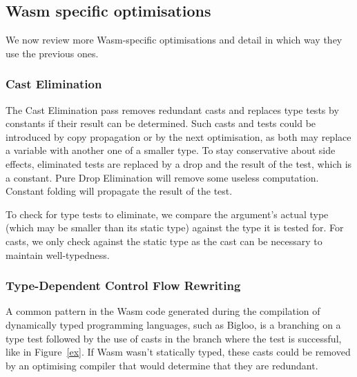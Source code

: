 \documentclass[a4paper,11pt]{article}
\begin{document}

\subsection{Wasm specific optimisations}
We now review more Wasm-specific optimisations and detail in which way they use
the previous ones.
\subsubsection{Cast Elimination}
The Cast Elimination pass removes redundant casts and replaces type tests by
constants if their result can be determined. Such casts and tests could be
introduced by copy propagation or by the next optimisation, as both may
replace a variable with another one of a smaller type. To stay conservative
about side effects, eliminated tests are replaced by a \textsf{drop} and the
result of the test, which is a constant. Pure Drop Elimination will remove some
useless computation. Constant folding will propagate the result of the test.

To check for type tests to eliminate, we compare the argument's actual type
(which may be smaller than its static type) against the type it is tested for.
For casts, we only check against the static type as the cast can be necessary to
maintain well-typedness.

\subsubsection{Type-Dependent Control Flow Rewriting}
A common pattern in the Wasm code generated during the compilation of
dynamically typed programming languages, such as Bigloo, is a branching on a
type test followed by the use of casts in the branch where the test is
successful, like in Figure~\ref{ex}. If Wasm wasn't statically typed, these
casts could be removed by an optimising compiler that would determine that they
are redundant.
\end{document}

